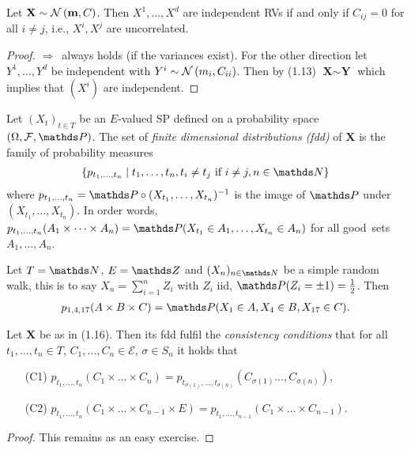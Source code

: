 \begin{prop}
Let $\textbf{X}\sim \mathcal{N}\left(\textbf{m},C\right)$.
Then $X^1,\dots,X^d$ are independent RVs if and only if $C_{ij}=0$ for all $i\not = j$, i.e., $X^i,X^j$ are uncorrelated.
\begin{proof}
\glqq $\Rightarrow$\grqq\, always holds (if the variances exist).
For the other direction let $Y^1,\dots,Y^d$ be independent with $Y^i\sim \mathcal{N}\left(m_i,C_{ii}\right)$.
Then by (1.13) $\textbf{X} \sim \textbf{Y}$ which implies that $(X^i)$ are independent.
\end{proof}
\end{prop}

\begin{defi}
Let $(X_t)_{t \in T}$ be an $E$-valued SP defined on a probability space $(\Omega,\mathcal{F},\Prob)$. The set of \emph{finite dimensional distributions (fdd)} of $\textbf{X}$ is the family of probability measures
\begin{align*}
\{p_{t_1,\dots,t_n}\mid t_1,\dots,t_n, t_i\not =t_j \text{ if } i \not = j,n\in \N\}
\end{align*}
where $p_{t_1,\dots,t_n}=\Prob \circ (X_{t_1},\dots,X_{t_n})^{-1}$ is the image of $\Prob$ under $(X_{t_1},\dots,X_{t_n})$.
In order words, $p_{t_1,\dots,t_n}(A_1\times \dots \times A_n)=\Prob(X_{t_1}\in A_1,\dots,X_{t_n}\in A_n)$ for all \glqq good\grqq\, sets $A_1,\dots,A_n$.
\end{defi}

\begin{bsp}
Let $T=\N$, $E=\Z$ and $(X_n)_{n\in \N}$ be a simple random walk, this is to say
$X_n=\sum_{i=1}^n Z_i$ with $Z_i$ iid, $\Prob(Z_i=\pm 1)=\frac{1}{2}$.
Then
\begin{align*}
p_{1,4,17}(A\times B\times C)=\Prob(X_1\in A,X_4\in B,X_{17}\in C).
\end{align*}
\end{bsp}

\begin{prop}
Let $\textbf{X}$ be as in (1.16). Then its fdd fulfil the \emph{consistency conditions} that for all $t_1,\dots,t_n \in T$, $C_1,\dots,C_n \in \mathcal{E}$, $\sigma\in S_n$ it holds that
\begin{enumerate}
\item[(C1)] $p_{t_1,\dots ,t_n}(C_1\times \dots \times C_n)=p_{t_{\sigma(1)},\dots ,t_{\sigma(n)}}(C_{\sigma(1)}\dots ,C_{\sigma(n)})$,
\item[(C2)] $p_{t_1,\dots , t_n}(C_1\times \dots \times C_{n-1}\times E)=p_{t_1,\dots ,t_{n-1}}(C_1\times \dots \times C_{n-1})$.
\end{enumerate}
\begin{proof}
This remains as an easy exercise.
\end{proof}
\end{prop}

